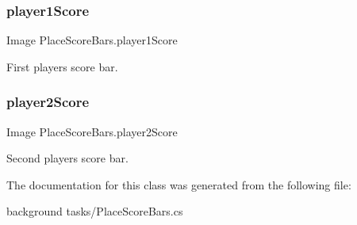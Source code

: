 \subsubsection{\texorpdfstring{player1\+Score}{player1Score}}
{\footnotesize\ttfamily Image Place\+Score\+Bars.\+player1\+Score}



First player\textquotesingle{}s score bar. 

\mbox{\label{class_place_score_bars_a53a2fc54c5de9160788eac17a2ff9e90}} 
\subsubsection{\texorpdfstring{player2\+Score}{player2Score}}
{\footnotesize\ttfamily Image Place\+Score\+Bars.\+player2\+Score}



Second player\textquotesingle{}s score bar. 



The documentation for this class was generated from the following file\+:\begin{DoxyCompactItemize}
\item 
background tasks/Place\+Score\+Bars.\+cs\end{DoxyCompactItemize}

